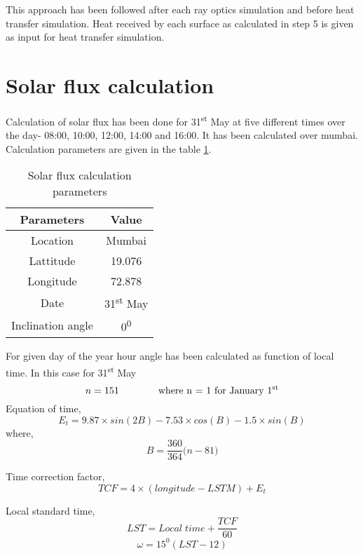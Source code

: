  


This approach has been followed after each ray optics simulation and before heat transfer simulation. Heat received by each surface as calculated in step 5 is given as input for heat transfer simulation.

\section{Solar flux calculation}
Calculation of solar flux has been done for 31\textsuperscript{st} May at five different times over the day- 08:00, 10:00, 12:00, 14:00 and 16:00. It has been calculated over mumbai. Calculation parameters are given in the table \ref{tab:solarFluxCalcParams}.


\begin{table}[H]
\centering
\caption{Solar flux calculation parameters}
\label{tab:solarFluxCalcParams}
\begin{tabular}{@{}|c|c|@{}}
\toprule
\textbf{Parameters} & \textbf{Value} \\ \midrule
Location            & Mumbai         \\ \midrule
Lattitude           & 19.076         \\ \midrule
Longitude           & 72.878          \\ \midrule
Date                & 31\textsuperscript{st} May       \\ \midrule
Inclination angle   & 0\textsuperscript{0}              \\ \bottomrule
\end{tabular}
\end{table}

For given day of the year hour angle has been calculated as function of local time. In this case for 31\textsuperscript{st} May\\ 
\[
n = 151 \qquad \qquad \text{where n = 1 for January 1\textsuperscript{st}} 
\]
Equation of time,
\begin{equation}
E_{t} =  9.87\times sin(2B)-7.53\times cos(B)-1.5\times sin(B)
\end{equation}
where, 
\[
B = \frac{360}{364}\big(n-81\big)
\]

Time correction factor,
\begin{equation}
TCF = 4\times (longitude - LSTM) + E_{t}
\end{equation}

Local standard time,
\begin{equation}
LST = Local\; time + \frac{TCF}{60}
\end{equation}
\begin{equation}\label{eq:hourAngle}
\omega = 15^0 (LST-12)
\end{equation}

